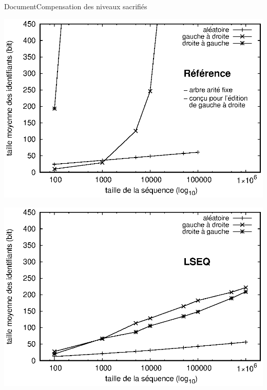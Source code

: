 \begin{frame}{Document}{Compensation des niveaux sacrifiés}

  \hspace{-1cm}
  \begin{minipage}{0.45\textwidth}
    \begin{center}
      
    \end{center}
  \end{minipage}
  \hfill
  \begin{minipage}{0.45\textwidth}
    \begin{center}
      
    \end{center}
  \end{minipage}

  \vspace{0.4cm}\hspace{-1cm}
  \begin{minipage}{0.45\textwidth}
    \includegraphics[width=1.25\textwidth]{img/replication/logoot.eps}
  \end{minipage}
  \hspace{1.5cm}
  \begin{minipage}{0.45\textwidth}
    \includegraphics[width=1.25\textwidth]{img/replication/lseq.eps}
  \end{minipage}


\end{frame}
